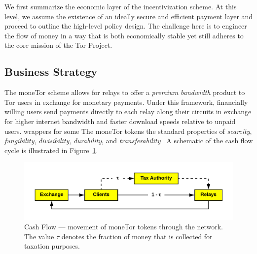 
We first summarize the economic layer of the incentivization scheme. At this
level, we assume the existence of an ideally secure and efficient payment layer
and proceed to outline the high-level policy design. The challenge here is to
engineer the flow of money in a way that is both economically stable yet still
adheres to the core mission of the Tor Project.

\subsection{Business Strategy}

The moneTor scheme allows for relays to offer a \emph{premium bandwidth} product
to Tor users in exchange for monetary payments. Under this framework,
financially willing users send payments directly to each relay along their
circuits in exchange for higher internet bandwidth and faster download speeds
relative to unpaid users. %
wrappers for some
The moneTor tokens %
the standard properties of \textit{scarcity}, \textit{fungibility},
\textit{divisibility}, \textit{durability}, and
\textit{transferability}~\cite[p.3]{crump2011phenomenon} A schematic of the cash
flow cycle is illustrated in Figure~\ref{fig:economic}.

\begin{figure}[h] \centering
  \includegraphics[trim={0.5cm, 0.5cm, 0.5cm, 0.5cm}, clip,
    scale=0.7]{images/economic_diagram.png}
  \caption[Cash Flow]{Cash Flow --- movement of moneTor tokens through the
    network. The value $\tau$ denotes the fraction of money that is collected
    for taxation purposes.}
  \label{fig:economic}
\end{figure}

